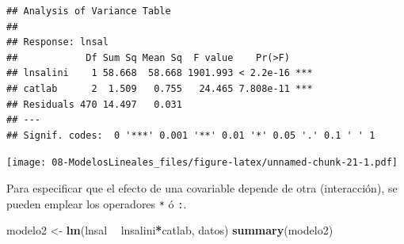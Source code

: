 \documentclass[]{book}
\newenvironment{Shaded}{\begin{snugshade}}{\end{snugshade}}
\newcommand{\KeywordTok}[1]{\textcolor[rgb]{0.13,0.29,0.53}{\textbf{#1}}}
\newcommand{\DataTypeTok}[1]{\textcolor[rgb]{0.13,0.29,0.53}{#1}}
\newcommand{\DecValTok}[1]{\textcolor[rgb]{0.00,0.00,0.81}{#1}}
\newcommand{\StringTok}[1]{\textcolor[rgb]{0.31,0.60,0.02}{#1}}
\newcommand{\OperatorTok}[1]{\textcolor[rgb]{0.81,0.36,0.00}{\textbf{#1}}}
\newcommand{\NormalTok}[1]{#1}
\begin{document}
\begin{verbatim}
## Analysis of Variance Table
## 
## Response: lnsal
##            Df Sum Sq Mean Sq  F value    Pr(>F)    
## lnsalini    1 58.668  58.668 1901.993 < 2.2e-16 ***
## catlab      2  1.509   0.755   24.465 7.808e-11 ***
## Residuals 470 14.497   0.031                       
## ---
## Signif. codes:  0 '***' 0.001 '**' 0.01 '*' 0.05 '.' 0.1 ' ' 1
\end{verbatim}

\begin{Shaded}
\end{Shaded}

\texttt{[image: 08-ModelosLineales\_files/figure-latex/unnamed-chunk-21-1.pdf]}

Para especificar que el efecto de una covariable depende de otra
(interacción), se pueden emplear los operadores \texttt{*} ó \texttt{:}.

\begin{Shaded}
\begin{Highlighting}[]
\NormalTok{modelo2 <-}\StringTok{ }\KeywordTok{lm}\NormalTok{(lnsal }\OperatorTok{~}\StringTok{ }\NormalTok{lnsalini}\OperatorTok{*}\NormalTok{catlab, datos)}
\KeywordTok{summary}\NormalTok{(modelo2)}
\end{Highlighting}
\end{Shaded}
\end{document}
